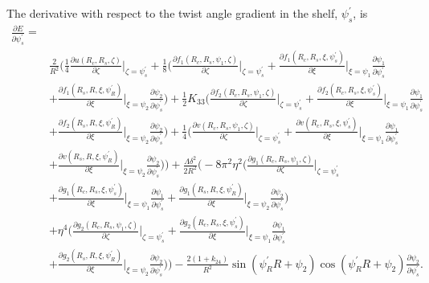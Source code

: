 \documentclass[12pt]{article}
\begin{document}
The derivative with respect to the twist angle gradient in the shelf, $\psi_s^{\prime}$, is
\begin{align}
\frac{\partial E}{\partial \psi_s^{\prime}}=&\nonumber\\
&\frac{2}{R^2}\bigg(\frac{1}{4}\frac{\partial u(R_c,R_s,\zeta)}{\partial\zeta}\bigg|_{\zeta=\psi_s^{\prime}}+\frac{1}{8}\bigg(\frac{\partial f_1(R_c,R_s,\psi_1,\zeta)}{\partial\zeta}\bigg|_{\zeta=\psi_s^{\prime}}+\frac{\partial f_1(R_c,R_s,\xi,\psi_s^{\prime})}{\partial\xi}\bigg|_{\xi=\psi_1}\frac{\partial\psi_1}{\partial\psi_s^{\prime}}\nonumber\\
&+\frac{\partial f_1(R_s,R,\xi,\psi_R^{\prime})}{\partial\xi}\bigg|_{\xi=\psi_2}\frac{\partial\psi_2}{\partial\psi_s^{\prime}}\bigg)+\frac{1}{2}K_{33}\bigg(\frac{\partial f_2(R_c,R_s,\psi_1,\zeta)}{\partial\zeta}\bigg|_{\zeta=\psi_s^{\prime}}+\frac{\partial f_2(R_c,R_s,\xi,\psi_s^{\prime})}{\partial\xi}\bigg|_{\xi=\psi_1}\frac{\partial\psi_1}{\partial\psi_s^{\prime}}\nonumber\\
&+\frac{\partial f_2(R_s,R,\xi,\psi_R^{\prime})}{\partial\xi}\bigg|_{\xi=\psi_2}\frac{\partial\psi_2}{\partial\psi_s^{\prime}}\bigg)+\frac{1}{4}\bigg(\frac{\partial v(R_c,R_s,\psi_1,\zeta)}{\partial\zeta}\bigg|_{\zeta=\psi_s^{\prime}}+\frac{\partial v(R_c,R_s,\xi,\psi_s^{\prime})}{\partial\xi}\bigg|_{\xi=\psi_1}\frac{\partial\psi_1}{\partial\psi_s^{\prime}}\nonumber\\
&+\frac{\partial v(R_s,R,\xi,\psi_R^{\prime})}{\partial\xi}\bigg|_{\xi=\psi_2}\frac{\partial\psi_2}{\partial\psi_s^{\prime}}\bigg)\bigg)+\frac{\Lambda\delta^2}{2R^2}\bigg(-8\pi^2\eta^2\bigg(\frac{\partial g_1(R_c,R_s,\psi_1,\zeta)}{\partial\zeta}\bigg|_{\zeta=\psi_s^{\prime}}\nonumber\\
&+\frac{\partial g_1(R_c,R_s,\xi,\psi_s^{\prime})}{\partial\xi}\bigg|_{\xi=\psi_1}\frac{\partial\psi_1}{\partial\psi_s^{\prime}}+\frac{\partial g_1(R_s,R,\xi,\psi_R^{\prime})}{\partial\xi}\bigg|_{\xi=\psi_2}\frac{\partial\psi_2}{\partial\psi_s^{\prime}}\bigg)\nonumber\\
&+\eta^4\bigg(\frac{\partial g_2(R_c,R_s,\psi_1,\zeta)}{\partial\zeta}\bigg|_{\zeta=\psi_s^{\prime}}+\frac{\partial g_2(R_c,R_s,\xi,\psi_s^{\prime})}{\partial\xi}\bigg|_{\xi=\psi_1}\frac{\partial\psi_1}{\partial\psi_s^{\prime}}\nonumber\\
&+\frac{\partial g_2(R_s,R,\xi,\psi_R^{\prime})}{\partial\xi}\bigg|_{\xi=\psi_2}\frac{\partial\psi_2}{\partial\psi_s^{\prime}}\bigg)\bigg)-\frac{2(1+k_{24})}{R^2}\sin(\psi_R^{\prime}R+\psi_2)\cos(\psi_R^{\prime}R+\psi_2)\frac{\partial\psi_2}{\partial\psi_s^{\prime}}.\label{eq:dEdpsi_sp}
\end{align}
\end{document}
